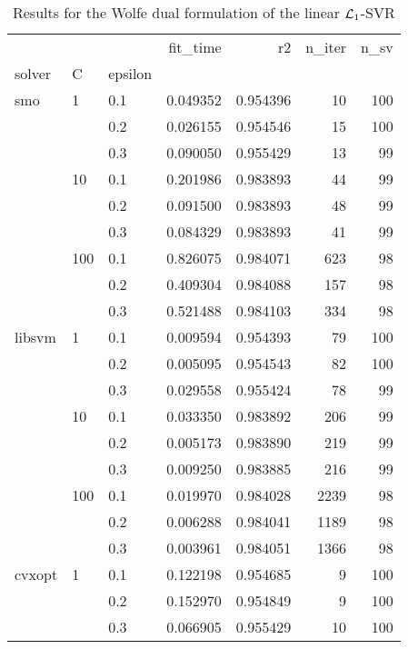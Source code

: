 \begin{table}[H]
\centering
\caption{Results for the Wolfe dual formulation of the linear $\protect \mathcal{L}_1$-SVR}
\label{linear_dual_l1_svr_cv_results}
\begin{tabular}{lllrrrr}
\toprule
       &     &     &  fit\_time &        r2 &  n\_iter &  n\_sv \\
solver & C & epsilon &           &           &         &       \\
\midrule
smo & 1   & 0.1 &  0.049352 &  0.954396 &      10 &   100 \\
       &     & 0.2 &  0.026155 &  0.954546 &      15 &   100 \\
       &     & 0.3 &  0.090050 &  0.955429 &      13 &    99 \\
       & 10  & 0.1 &  0.201986 &  0.983893 &      44 &    99 \\
       &     & 0.2 &  0.091500 &  0.983893 &      48 &    99 \\
       &     & 0.3 &  0.084329 &  0.983893 &      41 &    99 \\
       & 100 & 0.1 &  0.826075 &  0.984071 &     623 &    98 \\
       &     & 0.2 &  0.409304 &  0.984088 &     157 &    98 \\
       &     & 0.3 &  0.521488 &  0.984103 &     334 &    98 \\
libsvm & 1   & 0.1 &  0.009594 &  0.954393 &      79 &   100 \\
       &     & 0.2 &  0.005095 &  0.954543 &      82 &   100 \\
       &     & 0.3 &  0.029558 &  0.955424 &      78 &    99 \\
       & 10  & 0.1 &  0.033350 &  0.983892 &     206 &    99 \\
       &     & 0.2 &  0.005173 &  0.983890 &     219 &    99 \\
       &     & 0.3 &  0.009250 &  0.983885 &     216 &    99 \\
       & 100 & 0.1 &  0.019970 &  0.984028 &    2239 &    98 \\
       &     & 0.2 &  0.006288 &  0.984041 &    1189 &    98 \\
       &     & 0.3 &  0.003961 &  0.984051 &    1366 &    98 \\
cvxopt & 1   & 0.1 &  0.122198 &  0.954685 &       9 &   100 \\
       &     & 0.2 &  0.152970 &  0.954849 &       9 &   100 \\
       &     & 0.3 &  0.066905 &  0.955429 &      10 &   100 \\

\end{tabular}
\end{table}
